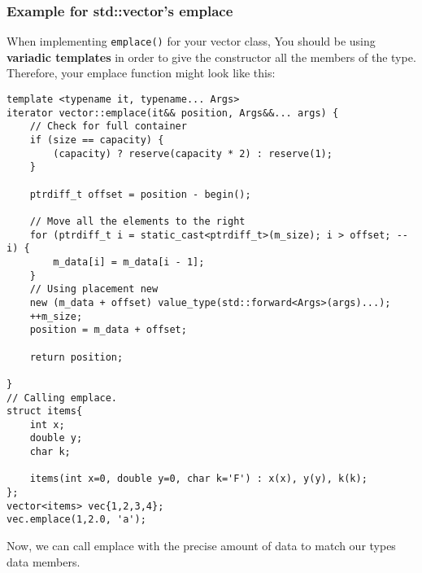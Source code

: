 \documentclass{report}
\begin{document}
\subsubsection*{Example for std::vector's emplace}
When implementing \texttt{emplace()} for your vector class, You should be using \textbf{variadic templates} in order to give the constructor all the members of the type. Therefore, your emplace function might look like this:
\begin{verbatim}
template <typename it, typename... Args>
iterator vector::emplace(it&& position, Args&&... args) {
    // Check for full container
    if (size == capacity) {
        (capacity) ? reserve(capacity * 2) : reserve(1);
    }
    
    ptrdiff_t offset = position - begin();

    // Move all the elements to the right
    for (ptrdiff_t i = static_cast<ptrdiff_t>(m_size); i > offset; --i) {
        m_data[i] = m_data[i - 1];
    }
    // Using placement new
    new (m_data + offset) value_type(std::forward<Args>(args)...);
    ++m_size;
    position = m_data + offset;

    return position;

}
// Calling emplace.
struct items{
    int x;
    double y;
    char k;

    items(int x=0, double y=0, char k='F') : x(x), y(y), k(k);
};
vector<items> vec{1,2,3,4};
vec.emplace(1,2.0, 'a');
\end{verbatim}
Now, we can call emplace with the precise amount of data to match our types data members.
\end{document}
